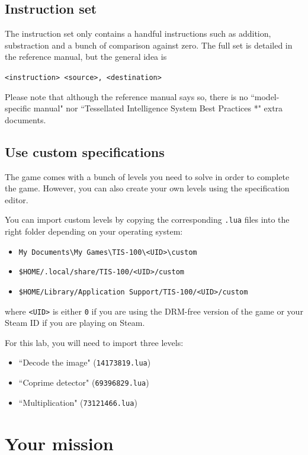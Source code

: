 \documentclass[10pt,a4paper]{article}
\theoremstyle{definition}%
\begin{document}
\subsection{Instruction set}
The instruction set only contains a handful instructions such as addition, substraction and a bunch of comparison against zero.
The full set is detailed in the reference manual, but the general idea is
\begin{center}
	\verb!<instruction> <source>, <destination>!
\end{center}

Please note that although the reference manual says so, there is no ``model-specific manual" nor ``Tessellated Intelligence System Best Practices *" extra documents.

\subsection{Use custom specifications}
The game comes with a bunch of levels you need to solve in order to complete the game.
However, you can also create your own levels using the specification editor.

You can import custom levels by copying the corresponding \texttt{.lua} files into the right folder depending on your operating system:
\begin{itemize}
	\item[\faWindows] \verb|My Documents\My Games\TIS-100\<UID>\custom|
	\item[\faLinux] \verb|$HOME/.local/share/TIS-100/<UID>/custom|
	\item[\faApple] \verb|$HOME/Library/Application Support/TIS-100/<UID>/custom|
\end{itemize}
where \texttt{<UID>} is either \texttt{0} if you are using the DRM-free version of the game or your Steam ID if you are playing on Steam.

For this lab, you will need to import three levels:
\begin{itemize}
	\item ``Decode the image" (\texttt{14173819.lua})
	\item ``Coprime detector" (\texttt{69396829.lua})
	\item ``Multiplication" (\texttt{73121466.lua})
\end{itemize}


\section{Your mission}
\end{document}
